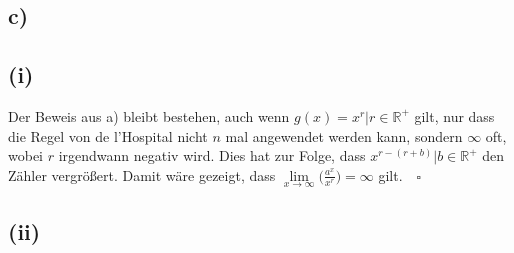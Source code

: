 \documentclass[a4paper]{scrartcl}
\newcommand{\qed}{\quad \square}
\begin{document}
\subsection{c)}
\subsection{(i)}
Der Beweis aus a) bleibt bestehen, auch wenn \(g(x)=x^r|r\in\mathbb{R^+}\) gilt, nur dass die Regel von de l'Hospital nicht \(n\)  mal angewendet werden kann, sondern \(\infty\) oft, wobei \(r\) irgendwann negativ wird. Dies hat zur Folge, dass \(x^{r-(r+b)}|b\in\mathbb{R^+}\) den Zähler vergrößert.
Damit wäre gezeigt, dass \(\lim\limits_{x\to\infty}\bigg(\frac{a^x}{x^r}\bigg)=\infty\) gilt.\(\qed\) 
\subsection{(ii)}
\end{document}
